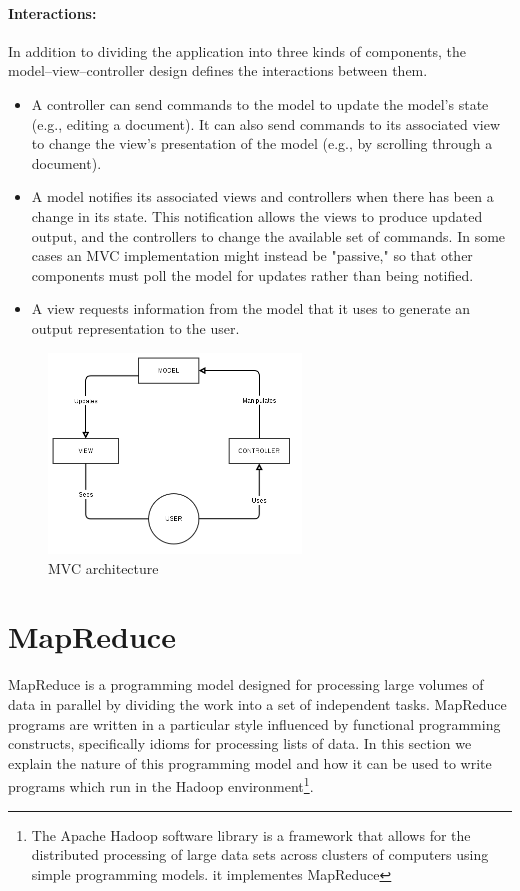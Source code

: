\paragraph{Interactions:}

In addition to dividing the application into three kinds of components, the model–view–controller design defines the interactions between them.

\begin{itemize}
\item A controller can send commands to the model to update the model's state (e.g., editing a document). It can also send commands to its associated view to change the view's presentation of the model (e.g., by scrolling through a document).
\item A model notifies its associated views and controllers when there has been a change in its state. This notification allows the views to produce updated output, and the controllers to change the available set of commands. In some cases an MVC implementation might instead be "passive," so that other components must poll the model for updates rather than being notified.
\item A view requests information from the model that it uses to generate an output representation to the user.
\end{itemize}

\begin{figure}
\centering
\includegraphics[width=0.6\textwidth]{../images/mvc.png}
\caption{\label{fig:frog} MVC architecture}
\end{figure}

\section{MapReduce}

MapReduce is a programming model designed for processing large volumes of data in parallel by dividing the work into a set of independent tasks. MapReduce programs are written in a particular style influenced by functional programming constructs, specifically idioms for processing lists of data. In this section we explain the nature of this programming model and how it can be used to write programs which run in the Hadoop environment\footnote{The Apache Hadoop software library is a framework that allows for the distributed processing of large data sets across clusters of computers using simple programming models. it implementes MapReduce}.

